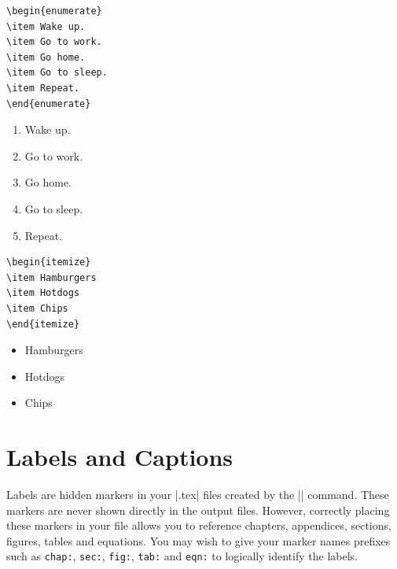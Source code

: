 \begin{minipage}{.45\textwidth}
\begin{Verbatim}
\begin{enumerate}
\item Wake up.
\item Go to work.
\item Go home.
\item Go to sleep.
\item Repeat.
\end{enumerate}
\end{Verbatim}
\end{minipage}
\hfill
\begin{minipage}{.45\textwidth}
\begin{enumerate}
\item Wake up.
\item Go to work.
\item Go home.
\item Go to sleep.
\item Repeat.
\end{enumerate}
\end{minipage}

\begin{minipage}{.45\textwidth}
\begin{Verbatim}
\begin{itemize}
\item Hamburgers
\item Hotdogs
\item Chips
\end{itemize}
\end{Verbatim}
\end{minipage}
\hfill
\begin{minipage}{.45\textwidth}
\begin{itemize}
\item Hamburgers
\item Hotdogs
\item Chips
\end{itemize}
\end{minipage}


\section{Labels and Captions}\label{sec:labels}

Labels are hidden markers in your |.tex| files created by the |\label{name}|
command.  These markers are never shown directly in the output files.  However,
correctly placing these markers in your file allows you to reference chapters,
appendices, sections, figures, tables and equations.  You may wish to give your
marker names prefixes such as \texttt{chap:}, \texttt{sec:}, \texttt{fig:},
\texttt{tab:} and \texttt{eqn:} to logically identify the labels.

